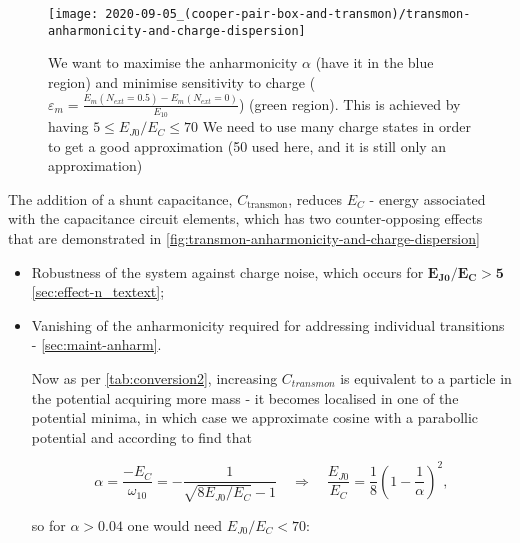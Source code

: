 \begin{figure}[h]
  \centering
  \texttt{[image: 2020-09-05\_(cooper-pair-box-and-transmon)/transmon-anharmonicity-and-charge-dispersion]}
  \caption{\small We  want to maximise the  anharmonicity $\alpha$ (have
    it  in  the   blue  region)  and  minimise   sensitivity  to  charge
    ($\varepsilon_m = \frac{E_m(N_{ext}=0.5) - E_m(N_{ext}=0)}{E_{10}}$)
    (green     region).      This      is     achieved     by     having
    $5 \le E_{J0}/E_C \le 70$ We need to use many charge states in order
    to get a good  approximation (50 used here, and it  is still only an
    approximation)\label{fig:transmon-anharmonicity-and-charge-dispersion}}
\end{figure}

The  addition of  a  shunt  capacitance, $C_{\text{transmon}}$,  reduces
$E_{C}$ - energy associated with the capacitance circuit elements, which
has   two   counter-opposing   effects    that   are   demonstrated   in
\autoref{fig:transmon-anharmonicity-and-charge-dispersion}
\begin{itemize}
\item Robustness  of the system  against charge noise, which  occurs for
  $\mathbf{E_{J0}/E_C>5}$ \hfill \autoref{sec:effect-n_textext};
\item Vanishing of the  anharmonicity required for addressing individual
  transitions  - 
  \cite{Kjaergaard_2020} \hfill \autoref{sec:maint-anharm}.

  Now  as per  \autoref{tab:conversion2},  increasing $C_{transmon}$  is
  equivalent to  a particle in  the potential  acquiring more mass  - it
  becomes localised  in one of  the potential  minima, in which  case we
  approximate  cosine  with  a  parabollic potential  and  according  to
  \cite{Koch_2007} find that

\begin{equation}\label{eq:transmon-anharmonicity}
  \alpha = \frac{-E_{C}}{\omega_{10}} = -\frac{1}{\sqrt{8E_{J0}/E_C} - 1} \quad \Rightarrow \quad \frac{E_{J0}}{E_C} = \frac{1}{8}\left( 1 - \frac{1}{\alpha} \right)^2,
\end{equation}

\noindent so for $\alpha>0.04$ one would need $E_{J0}/E_C < 70$:
\end{itemize}

